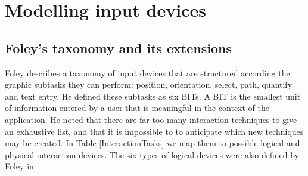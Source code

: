 % 
% 
% 
% 
% 

	
\section{Modelling input devices} 
\label{interactionTasks}

\subsection{Foley's taxonomy and its extensions}
	
	Foley \cite{Foley1984} describes a taxonomy of input devices that are structured according the graphic subtasks they can perform: position, orientation, select, path, quantify and text entry. He defined these subtasks as six \acp{BIT}. A \ac{BIT} is the smallest unit of information entered by a user that is meaningful in the context of the application. He noted that there are far too many interaction techniques to give an exhaustive list, and that it is impossible to to anticipate which new techniques may be created. In Table \ref{InteractionTasks} we map them to possible logical and physical interaction devices. The six types of logical devices were also defined by Foley in \cite{Foley1996}.
	
